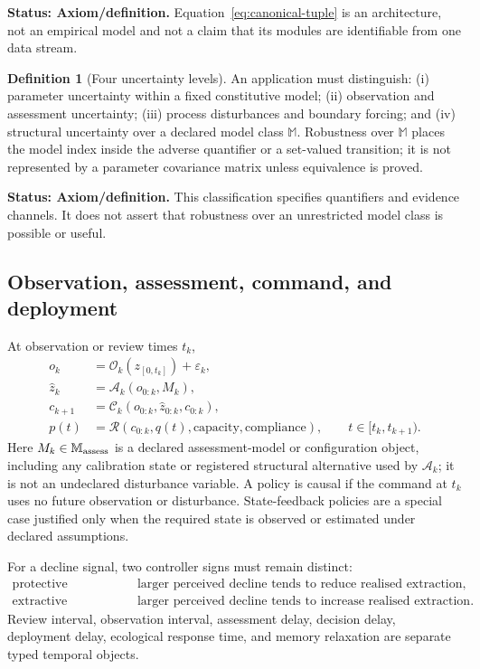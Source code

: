 \documentclass[11pt]{article}
\theoremstyle{definition}
\newtheorem{definition}{Definition}
\newcommand{\status}[1]{\par\smallskip\noindent\textbf{Status: #1.}\quad}
\begin{document}
\status{Axiom/definition} Equation~\eqref{eq:canonical-tuple} is an architecture, not an empirical model and not a claim that its modules are identifiable from one data stream.

\begin{definition}[Four uncertainty levels]
An application must distinguish: (i) parameter uncertainty within a fixed constitutive model; (ii) observation and assessment uncertainty; (iii) process disturbances and boundary forcing; and (iv) structural uncertainty over a declared model class $\mathbb M$. Robustness over $\mathbb M$ places the model index inside the adverse quantifier or a set-valued transition; it is not represented by a parameter covariance matrix unless equivalence is proved.
\end{definition}

\status{Axiom/definition} This classification specifies quantifiers and evidence channels. It does not assert that robustness over an unrestricted model class is possible or useful.

\subsection{Observation, assessment, command, and deployment}

At observation or review times $t_k$,
\begin{align}
o_k&=\mathcal O_k(z_{[0,t_k]})+\varepsilon_k,\\
\widehat z_k&=\mathcal A_k(o_{0:k},M_k),\\
c_{k+1}&=\mathcal C_k(o_{0:k},\widehat z_{0:k},c_{0:k}),\\
p(t)&=\mathcal R(c_{0:k},q(t),\text{capacity},\text{compliance}),
\qquad t\in[t_k,t_{k+1}).
\end{align}
Here $M_k\in\mathbb M_{\rm assess}$ is a declared assessment-model or configuration object, including any calibration state or registered structural alternative used by $\mathcal A_k$; it is not an undeclared disturbance variable.
A policy is causal if the command at $t_k$ uses no future observation or disturbance. State-feedback policies are a special case justified only when the required state is observed or estimated under declared assumptions.

For a decline signal, two controller signs must remain distinct:
\begin{align*}
\text{protective channel:}&\quad \text{larger perceived decline tends to reduce realised extraction},\\
\text{extractive channel:}&\quad \text{larger perceived decline tends to increase realised extraction}.
\end{align*}
Review interval, observation interval, assessment delay, decision delay, deployment delay, ecological response time, and memory relaxation are separate typed temporal objects.
\end{document}
